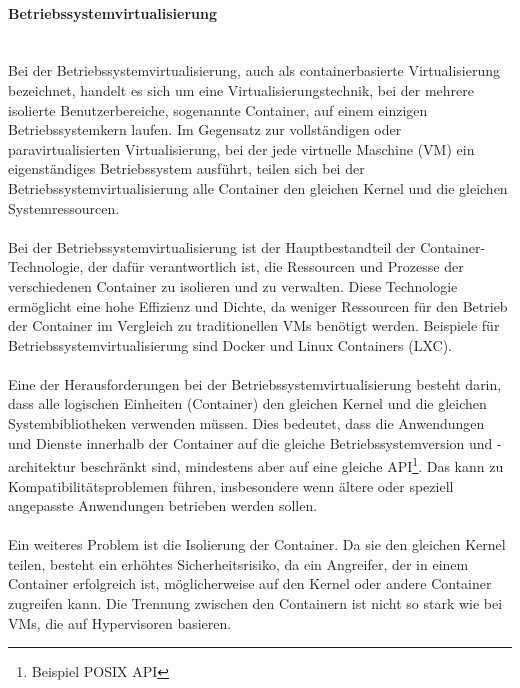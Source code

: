 \paragraph{Betriebssystemvirtualisierung\\\\}
Bei der Betriebssystemvirtualisierung, auch als containerbasierte Virtualisierung bezeichnet, handelt es sich um eine Virtualisierungstechnik, bei der mehrere isolierte Benutzerbereiche, sogenannte Container, auf einem einzigen Betriebssystemkern laufen. Im Gegensatz zur vollständigen oder paravirtualisierten Virtualisierung, bei der jede virtuelle Maschine (VM) ein eigenständiges Betriebssystem ausführt, teilen sich bei der Betriebssystemvirtualisierung alle Container den gleichen Kernel und die gleichen Systemressourcen.
\\\\
Bei der Betriebssystemvirtualisierung ist der Hauptbestandteil der Container-Technologie, der dafür verantwortlich ist, die Ressourcen und Prozesse der verschiedenen Container zu isolieren und zu verwalten. Diese Technologie ermöglicht eine hohe Effizienz und Dichte, da weniger Ressourcen für den Betrieb der Container im Vergleich zu traditionellen VMs benötigt werden. Beispiele für Betriebssystemvirtualisierung sind Docker und Linux Containers (LXC).
\\\\
Eine der Herausforderungen bei der Betriebssystemvirtualisierung besteht darin, dass alle logischen Einheiten (Container) den gleichen Kernel und die gleichen Systembibliotheken verwenden müssen. Dies bedeutet, dass die Anwendungen und Dienste innerhalb der Container auf die gleiche Betriebssystemversion und -architektur beschränkt sind, mindestens aber auf eine gleiche API\footnote{Beispiel POSIX API}. Das kann zu Kompatibilitätsproblemen führen, insbesondere wenn ältere oder speziell angepasste Anwendungen betrieben werden sollen.
\\\\
Ein weiteres Problem ist die Isolierung der Container. Da sie den gleichen Kernel teilen, besteht ein erhöhtes Sicherheitsrisiko, da ein Angreifer, der in einem Container erfolgreich ist, möglicherweise auf den Kernel oder andere Container zugreifen kann. Die Trennung zwischen den Containern ist nicht so stark wie bei VMs, die auf Hypervisoren basieren.

